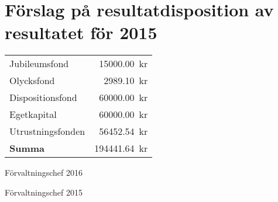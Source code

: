 \documentclass[../_main/handlingar.tex]{subfiles}
\begin{document}
\section{Förslag på resultatdisposition av resultatet för 2015}

\begin{tabular}{l r}
    Jubileumsfond & \SI{15000.00}{kr} \\
    Olycksfond & \SI{2989.10}{kr} \\
    Dispositionsfond & \SI{60000.00}{kr} \\
    Egetkapital & \SI{60000.00}{kr} \\
    Utrustningsfonden & \SI{56452.54}{kr} \\
    \hline
    \textbf{Summa} & \SI{194441.64}{kr} \\
\end{tabular}

\begin{signatures}{2}
    \ist
    \signature{Anders Nilsson}{Förvaltningschef 2016}
    \signature{Henrik Felding}{Förvaltningschef 2015}
\end{signatures}
\end{document}

